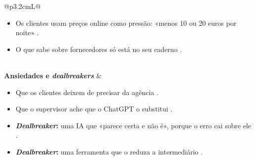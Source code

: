\begin{table}[H]
\begin{tabularx}{\textwidth}{@{}p{3.2cm}L@{}}
\begin{itemize}[topsep=0pt]
  \item Os clientes usam preços online como pressão: «menos 10 ou 20 euros por noite» .
  \item O que sabe sobre fornecedores só está no seu caderno .
\end{itemize} \\
\midrule
\textbf{Ansiedades e \textit{dealbreakers}} &
\begin{itemize}[topsep=0pt]
  \item Que os clientes deixem de precisar da agência .
  \item Que o supervisor ache que o ChatGPT o substitui .
  \item \textbf{\textit{Dealbreaker}:} uma IA que «parece certa e não é», porque o erro cai sobre ele .
  \item \textbf{\textit{Dealbreaker}:} uma ferramenta que o reduza a intermediário .
\end{itemize} \\
\bottomrule
\end{tabularx}
\caption{Persona Rui: objetivos, motivações, atritos e ansiedades.}
\label{tab:persona-rui}
\end{table}

